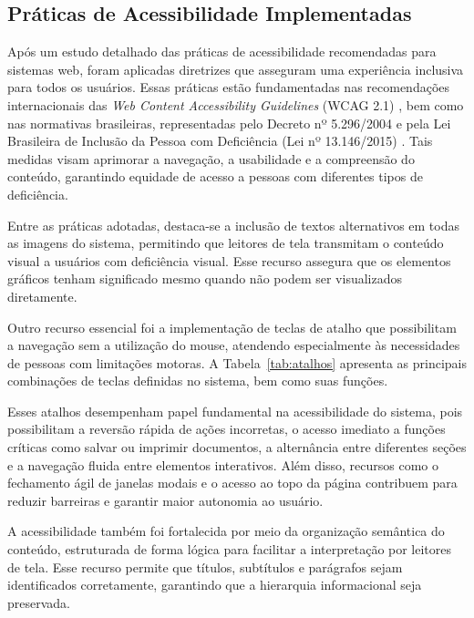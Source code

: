 \subsection{Práticas de Acessibilidade Implementadas}

Após um estudo detalhado das práticas de acessibilidade recomendadas para sistemas web, foram aplicadas diretrizes que asseguram uma experiência inclusiva para todos os usuários. Essas práticas estão fundamentadas nas recomendações internacionais das \textit{Web Content Accessibility Guidelines} (WCAG 2.1) \parencite{WCAG2018}, bem como nas normativas brasileiras, representadas pelo Decreto nº 5.296/2004 \parencite{Brasil2004} e pela Lei Brasileira de Inclusão da Pessoa com Deficiência (Lei nº 13.146/2015) \parencite{Brasil2015}. Tais medidas visam aprimorar a navegação, a usabilidade e a compreensão do conteúdo, garantindo equidade de acesso a pessoas com diferentes tipos de deficiência.

Entre as práticas adotadas, destaca-se a inclusão de textos alternativos em todas as imagens do sistema, permitindo que leitores de tela transmitam o conteúdo visual a usuários com deficiência visual. Esse recurso assegura que os elementos gráficos tenham significado mesmo quando não podem ser visualizados diretamente.

Outro recurso essencial foi a implementação de teclas de atalho que possibilitam a navegação sem a utilização do mouse, atendendo especialmente às necessidades de pessoas com limitações motoras. A Tabela~\ref{tab:atalhos} apresenta as principais combinações de teclas definidas no sistema, bem como suas funções.

Esses atalhos desempenham papel fundamental na acessibilidade do sistema, pois possibilitam a reversão rápida de ações incorretas, o acesso imediato a funções críticas como salvar ou imprimir documentos, a alternância entre diferentes seções e a navegação fluida entre elementos interativos. Além disso, recursos como o fechamento ágil de janelas modais e o acesso ao topo da página contribuem para reduzir barreiras e garantir maior autonomia ao usuário.

A acessibilidade também foi fortalecida por meio da organização semântica do conteúdo, estruturada de forma lógica para facilitar a interpretação por leitores de tela. Esse recurso permite que títulos, subtítulos e parágrafos sejam identificados corretamente, garantindo que a hierarquia informacional seja preservada. 

